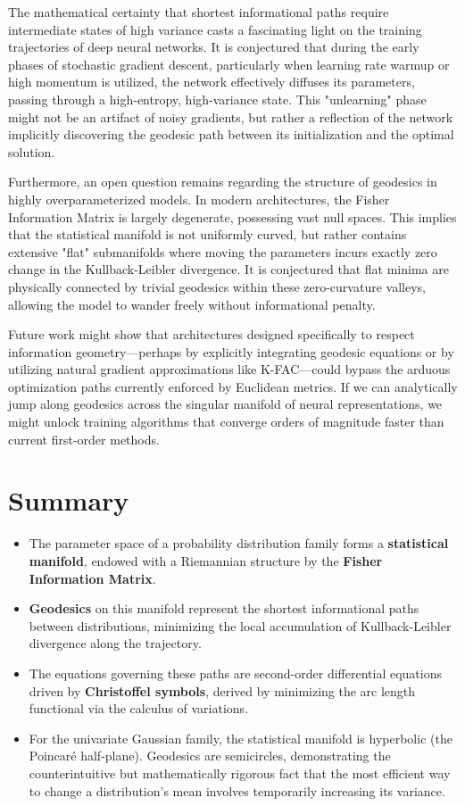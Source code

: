 \begin{horizon}
The mathematical certainty that shortest informational paths require intermediate states of high variance casts a fascinating light on the training trajectories of deep neural networks. It is conjectured that during the early phases of stochastic gradient descent, particularly when learning rate warmup or high momentum is utilized, the network effectively diffuses its parameters, passing through a high-entropy, high-variance state. This "unlearning" phase might not be an artifact of noisy gradients, but rather a reflection of the network implicitly discovering the geodesic path between its initialization and the optimal solution. 

Furthermore, an open question remains regarding the structure of geodesics in highly overparameterized models. In modern architectures, the Fisher Information Matrix is largely degenerate, possessing vast null spaces. This implies that the statistical manifold is not uniformly curved, but rather contains extensive "flat" submanifolds where moving the parameters incurs exactly zero change in the Kullback-Leibler divergence. It is conjectured that flat minima are physically connected by trivial geodesics within these zero-curvature valleys, allowing the model to wander freely without informational penalty.

Future work might show that architectures designed specifically to respect information geometry—perhaps by explicitly integrating geodesic equations or by utilizing natural gradient approximations like K-FAC—could bypass the arduous optimization paths currently enforced by Euclidean metrics. If we can analytically jump along geodesics across the singular manifold of neural representations, we might unlock training algorithms that converge orders of magnitude faster than current first-order methods.
\end{horizon}

\section{Summary}
\begin{itemize}
    \item The parameter space of a probability distribution family forms a \textbf{statistical manifold}, endowed with a Riemannian structure by the \textbf{Fisher Information Matrix}.
    \item \textbf{Geodesics} on this manifold represent the shortest informational paths between distributions, minimizing the local accumulation of Kullback-Leibler divergence along the trajectory.
    \item The equations governing these paths are second-order differential equations driven by \textbf{Christoffel symbols}, derived by minimizing the arc length functional via the calculus of variations.
    \item For the univariate Gaussian family, the statistical manifold is hyperbolic (the Poincaré half-plane). Geodesics are semicircles, demonstrating the counterintuitive but mathematically rigorous fact that the most efficient way to change a distribution's mean involves temporarily increasing its variance.
\end{itemize}


